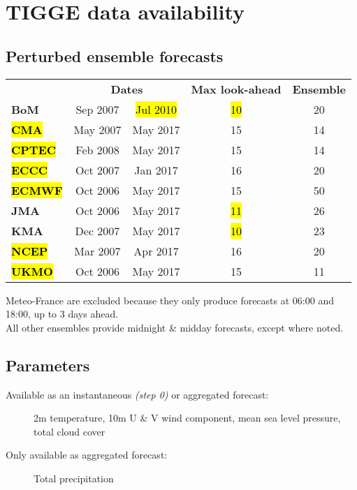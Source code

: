 \documentclass[10pt,fleqn]{article}
\newcommand{\gr}[1]{{\sethlcolor{Orange}\hl{#1}}}
\begin{document}
\section{TIGGE data availability}

\subsection{Perturbed ensemble forecasts}

\begin{tabular}{>{\bfseries}lcccc}
& \multicolumn{2}{c}{\textbf{Dates}} & \textbf{Max look-ahead} & \textbf{Ensemble}\\
BoM 	& Sep 2007 					& \gr{Jul 2010} 		& \gr{10} 	& 20	\\
\hl{CMA} 	& May 2007 					& May 2017 		& 15 	& 14	\\
\hl{CPTEC}	& Feb 2008 					& May 2017 		& 15 	& 14	\\
\hl{ECCC} 	& Oct 2007 					& Jan 2017 		& 16 	& 20	\\
\hl{ECMWF} 	& Oct 2006 					& May 2017 		& 15 	& 50	\\
JMA 	& Oct 2006\footnotemark[1] 	& May 2017 		& \gr{11} 	& 26	\\
KMA 	& Dec 2007 					& May 2017 		& \gr{10} 	& 23	\\
\hl{NCEP} 	& Mar 2007 					& Apr 2017 		& 16 	& 20	\\
\hl{UKMO} 	& Oct 2006 					& May 2017 		& 15 	& 11	\\
\end{tabular}

\begin{minipage}{0.95\textwidth}

\footnotesize{Meteo-France are excluded because they only produce forecasts at 06:00 and 18:00, up to 3 days ahead. \\ 
All other ensembles provide midnight \& midday forecasts, except where noted.}
\end{minipage}


\subsection{Parameters}

\begin{description}


\item[Available as an instantaneous \textit{(step 0)} or aggregated forecast:] 2m temperature, 10m U \& V wind component, mean sea level pressure, total cloud cover

\item[Only available as aggregated forecast:] Total precipitation
\end{description}
\end{document}
